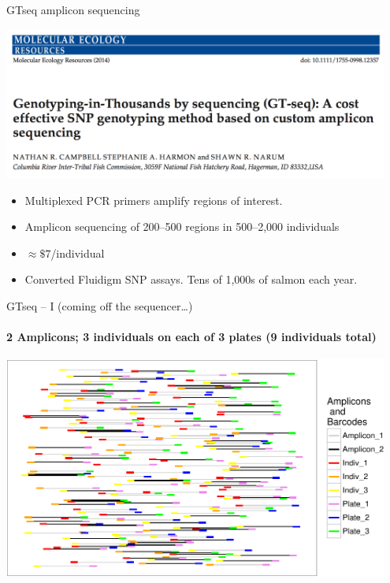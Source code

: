 \documentclass[letter,graphicx]{beamer}
\begin{document}
\begin{frame}{GTseq amplicon sequencing}
\begin{center}
\includegraphics[width=0.95\textwidth]{mhap_figs/gtseq-header.png}
\end{center}
\begin{itemize}
\item Multiplexed PCR primers amplify regions of interest.
\item Amplicon sequencing of 200--500 regions in 500--2,000 individuals
\item $\approx \$7$/individual
\item Converted Fluidigm SNP assays.  Tens of 1,000s of salmon each year.
\end{itemize}
\end{frame}








\begin{frame}{GTseq -- I {\small (coming off the sequencer\ldots)}}
\framesubtitle{2 Amplicons; 3 individuals on each of 3 plates (9 individuals total)}
\begin{center}
\includegraphics[width=0.95\textwidth]{mhap_figs/gtseq-soup-crop.pdf}
\end{center}
\end{frame}
\end{document}
